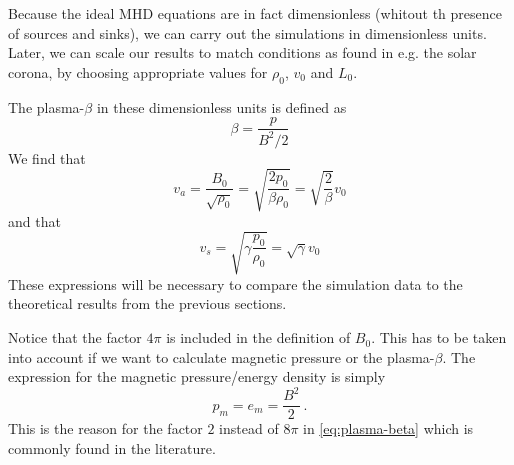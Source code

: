 Because the ideal MHD equations are in fact dimensionless (whitout th presence of sources and sinks), we can carry out the simulations in dimensionless units. 
Later, we can scale our results to match conditions as found in e.g. the solar corona, by choosing appropriate values for $\rho_0$, $v_0$ and $L_0$.

The plasma-$\beta$ in these dimensionless units is defined as
\begin{equation}
	\beta = \frac{p}{B^2/2}
	\label{eq:plasma-beta}
\end{equation}
We find that
\begin{equation}
	v_a = \frac{B_0}{\sqrt{\rho_0}} = \sqrt{ \frac{2p_0}{\beta\rho_0}} = \sqrt{ \frac{2}{\beta}}v_0
	\label{eq:Alfven-code-units}
\end{equation}
and that
\begin{equation}
	v_s = \sqrt{ \gamma\frac{p_0}{\rho_0}} = \sqrt{\gamma}v_0
	\label{eq:sound-code-units}
\end{equation}
These expressions will be necessary to compare the simulation data to the theoretical results from the previous sections.

Notice that the factor $4\pi$ is included in the definition of $B_0$. This has to be taken into account if we want to calculate magnetic pressure or the plasma-$\beta$.
The expression for the magnetic pressure/energy density is simply
\begin{equation}
	p_m = e_m = \frac{B^2}{2} \ .
	\label{eq:magnetic-pressure}
\end{equation}
This is the reason for the factor $2$ instead of $8\pi$ in \cref{eq:plasma-beta} which is commonly found in the literature.


